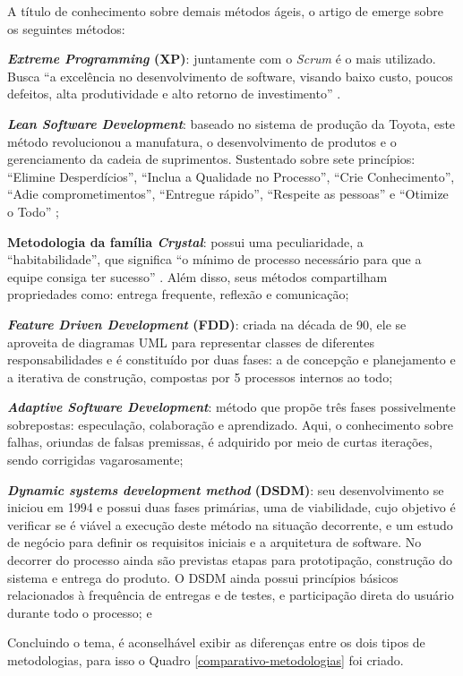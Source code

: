 A título de conhecimento sobre demais métodos ágeis, o artigo de  emerge sobre os seguintes métodos:


\textbf{\textit{Extreme Programming} (XP)}: juntamente com o \textit{Scrum} é o mais utilizado. Busca ``a excelência no desenvolvimento de software, visando baixo custo, poucos defeitos, alta produtividade e alto retorno de investimento'' \cite{sato2007uso}.


\textbf{\textit{Lean Software Development}}: baseado no sistema de produção da Toyota, este método revolucionou a manufatura, o desenvolvimento de produtos e o gerenciamento da cadeia de suprimentos. Sustentado sobre sete princípios: ``Elimine Desperdícios'', ``Inclua a Qualidade no Processo'', ``Crie Conhecimento'', ``Adie comprometimentos'', ``Entregue rápido'', ``Respeite as pessoas'' e ``Otimize o Todo'' \cite{sato2007uso};
 
 
\textbf{Metodologia da família \textit{Crystal}}: possui uma peculiaridade, a ``habitabilidade'', que significa ``o mínimo de processo necessário para que a equipe consiga ter sucesso'' \cite{sato2007uso}. Além disso, seus métodos compartilham propriedades como: entrega frequente, reflexão e comunicação;


\textbf{\textit{Feature Driven Development} (FDD)}: criada na década de 90, ele se aproveita de diagramas UML para representar classes de diferentes responsabilidades e é constituído por duas fases: a de concepção e planejamento e a iterativa de construção, compostas por 5 processos internos ao todo;


\textbf{\textit{Adaptive Software Development}}: método que propõe três fases possivelmente sobrepostas: especulação, colaboração e aprendizado. Aqui, o conhecimento sobre falhas, oriundas de falsas premissas, é adquirido por meio de curtas iterações, sendo corrigidas vagarosamente;


\textbf{\textit{Dynamic systems development method} (DSDM)}: seu desenvolvimento se iniciou em 1994 e possui duas fases primárias, uma de viabilidade, cujo objetivo é verificar se é viável a execução deste método na situação decorrente, e um estudo de negócio para definir os requisitos iniciais e a arquitetura de software. No decorrer do processo ainda são previstas etapas para prototipação, construção do sistema e entrega do produto. O DSDM ainda possui princípios básicos relacionados à frequência de entregas e de testes, e participação direta do usuário durante todo o processo; e


Concluindo o tema, é aconselhável exibir as diferenças entre os dois tipos de metodologias, para isso o Quadro \ref{comparativo-metodologias} foi criado.

